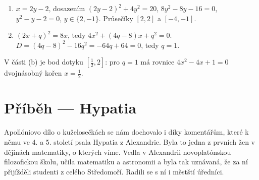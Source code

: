 \begin{solution}
  \begin{enumerate}[label=(\alph*)]
    \item $x = 2y - 2$, dosazením ${(2y - 2)}^2 + 4y^2 = 20$, $8y^2 - 8y - 16 = 0$, $y^2 - y - 2 = 0$, $y\in\{2, -1\}$. Průsečíky $[2, 2]$ a $[-4, -1]$.
    \item ${(2x + q)}^2 = 8x$, tedy $4x^2 + (4q - 8)x + q^2 = 0$. $D = {(4q - 8)}^2 - 16q^2 = -64q + 64 = 0$, tedy $q = 1$.
  \end{enumerate}
  \begin{center}
    \hspace{1.2cm}
  \end{center}
  V části (b) je bod dotyku $\left[\frac{1}{2}, 2\right]$: pro $q = 1$ má rovnice $4x^2 - 4x + 1 = 0$ dvojnásobný kořen $x = \frac{1}{2}$.
\end{solution}

\section{Příběh --- Hypatia}

Apollóniovo dílo o kuželosečkách se nám dochovalo i díky komentářům, které k němu ve 4. a 5. století psala Hypatia z Alexandrie. Byla to jedna z prvních žen v dějinách matematiky, o kterých víme. Vedla v Alexandrii novoplatónskou filozofickou školu, učila matematiku a astronomii a byla tak uznávaná, že za ní přijížděli studenti z celého Středomoří. Radili se s ní i městští úředníci.

